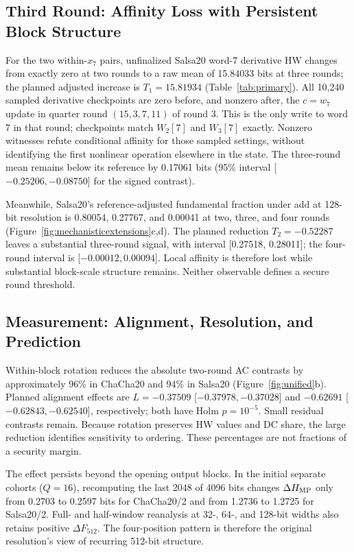 \documentclass[electronics,article,submit,pdftex,oneauthor]{Definitions/mdpi}
\begin{document}
\subsection{Third Round: Affinity Loss with Persistent Block Structure}\label{sec:transition}

For the two within-$x_7$ pairs, unfinalized Salsa20 word-7 derivative HW changes from exactly zero at two rounds to a raw mean of 15.84033 bits at three rounds; the planned adjusted increase is $T_1=15.81934$ (Table~\ref{tab:primary}). All 10,240 sampled derivative checkpoints are zero before, and nonzero after, the $c=w_7$ update in quarter round $(15,3,7,11)$ of round 3. This is the only write to word 7 in that round; checkpoints match $W_2[7]$ and $W_3[7]$ exactly. Nonzero witnesses refute conditional affinity for those sampled settings, without identifying the first nonlinear operation elsewhere in the state. The three-round mean remains below its reference by 0.17061 bits (95\% interval [$-0.25206,-0.08750$] for the signed contrast).

Meanwhile, Salsa20's reference-adjusted fundamental fraction under add at 128-bit resolution is 0.80054, 0.27767, and 0.00041 at two, three, and four rounds (Figure~\ref{fig:mechanisticextensions}c,d). The planned reduction $T_2=-0.52287$ leaves a substantial three-round signal, with interval [0.27518, 0.28011]; the four-round interval is [$-0.00012,0.00094$]. Local affinity is therefore lost while substantial block-scale structure remains. Neither observable defines a secure round threshold.

\subsection{Measurement: Alignment, Resolution, and Prediction}\label{sec:measurementresults}

Within-block rotation reduces the absolute two-round AC contrasts by approximately 96\% in ChaCha20 and 94\% in Salsa20 (Figure~\ref{fig:unified}b). Planned alignment effects are $L=-0.37509$ [$-0.37978,-0.37028$] and $-0.62691$ [$-0.62843,-0.62540$], respectively; both have Holm $p=10^{-5}$. Small residual contrasts remain. Because rotation preserves HW values and DC share, the large reduction identifies sensitivity to ordering. These percentages are not fractions of a security margin.

The effect persists beyond the opening output blocks. In the initial separate cohorts ($Q=16$), recomputing the last 2048 of 4096 bits changes $\Delta H_{\rm MP}$ only from 0.2703 to 0.2597 bits for ChaCha20/2 and from 1.2736 to 1.2725 for Salsa20/2. Full- and half-window reanalysis at 32-, 64-, and 128-bit widths also retains positive $\Delta F_{512}$. The four-position pattern is therefore the original resolution's view of recurring 512-bit structure.
\end{document}
